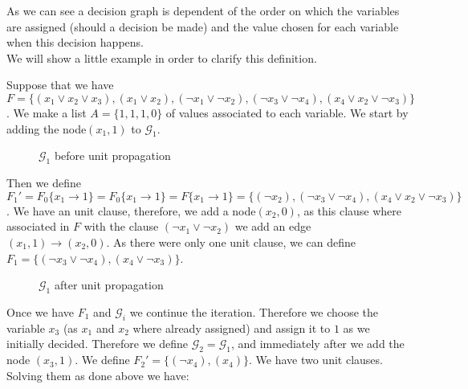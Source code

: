  As we can see a decision graph is dependent of the order on which the variables are assigned (should a decision be made) and the value chosen for each variable when this decision happens.\\

 We will show a little example in order to clarify this definition.
\begin{example} Suppose that we have 
$F = \{(x_1\vee x_2 \vee x_3), ( x_1 \vee x_2), (\neg x_1 \vee \neg x_2), (\neg x_3 \vee \neg x_4), (x_4 \vee x_2 \vee \neg x_3) \}$. 
We make a list $A=\{1,1,1,0\}$ of values associated to each variable. We start by adding the node$(x_1,1)$ to $\mathcal{G}_1$. \\
\begin{figure}[H]
  \centering
  \caption{$\mathcal{G}_1$ before unit propagation}
\end{figure}

Then we define $F_1' = F_0\{x_1\to 1\} =F_0\{x_1\to 1\} = F\{x_1 \to 1\}= \{(\neg x_2), (\neg x_3 \vee \neg x_4), (x_4 \vee x_2 \vee\neg x_3)\}$. We have an unit clause, therefore, we add a node$(x_2, 0)$, as this clause where associated in $F$ with the clause $(\neg x_1 \vee \neg x_2)$ we add an edge $(x_1,1)\to (x_2,0)$. As there were only one unit clause, we can define $F_1 = \{(\neg x_3 \vee \neg x_4), (x_4 \vee \neg x_3)\}$.

\begin{figure}[H]
  \centering
  \caption{$\mathcal{G}_1$ after unit propagation}
\end{figure} 

Once we have $F_1$ and $\mathcal{G}_i$ we continue the iteration. Therefore we choose the variable $x_3$ (as $x_1$ and $x_2$ where already assigned) and assign it to $1$ as we initially decided. Therefore we define $\mathcal{G}_2 = \mathcal{G}_1 $, and immediately after we add the node $(x_3,1)$. We define $F_2' = \{(\neg x_4), (x_4)\}$. We have two unit clauses. Solving them as done above we have: 


\end{example}
